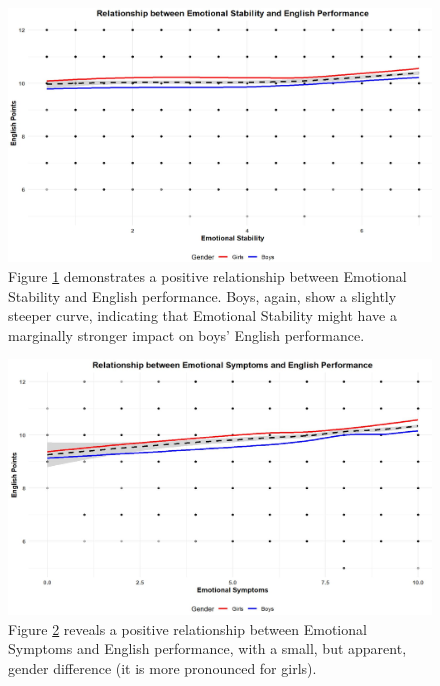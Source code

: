 \documentclass[12pt,a4paper,onecolumn]{article}
\numberwithin{equation}{section}
\begin{document}
\begin{figure}[ht] 
    \centering
    \includegraphics[width=1\linewidth]{production_function_english_emostab.JPG}
    \caption{Figure \ref{fig:emostab_English} demonstrates a positive relationship between Emotional Stability and English performance. Boys, again, show a slightly steeper curve, indicating that Emotional Stability might have a marginally stronger impact on boys' English performance.}
    \label{fig:emostab_English}
\end{figure}

\begin{figure}[ht] 
    \centering
    \includegraphics[width=1\linewidth]{production_function_english_emosym.JPG}
    \caption{Figure \ref{fig:emosym_English} reveals a positive relationship between Emotional Symptoms and English performance, with a small, but apparent, gender difference (it is more pronounced for girls).}
    \label{fig:emosym_English}
\end{figure}
\end{document}
